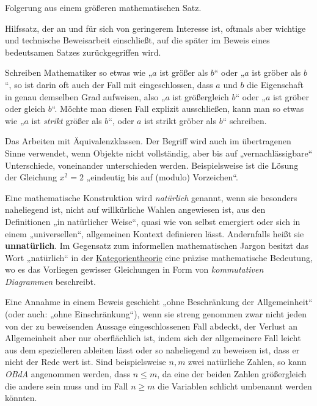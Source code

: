 \begin{description}[labelindent=0pt, leftmargin=0pt]
    \item[Korollar:] Folgerung aus einem größeren mathematischen Satz.

    \item[Lemma:] Hilfssatz, der an und für sich von geringerem Interesse ist, oftmals aber wichtige und technische Beweisarbeit einschließt, auf die später im Beweis eines bedeutsamen Satzes zurückgegriffen wird.

    \item[Mathematischer Komparativ:] Schreiben Mathematiker so etwas wie „$a$ ist größer als $b$“ oder „$a$ ist gröber als $b$“, so ist darin oft auch der Fall mit eingeschlossen, dass $a$ und $b$ die Eigenschaft in genau demselben Grad aufweisen, also „$a$ ist größergleich $b$“ oder „$a$ ist gröber oder gleich $b$“. Möchte man diesen Fall explizit ausschließen, kann man so etwas wie „$a$ ist \emph{strikt} größer als $b$“, oder $a$ ist strikt gröber als $b$“ schreiben.
    
    \item[Modulo:] Das Arbeiten mit Äquivalenzklassen. Der Begriff wird auch im übertragenen Sinne verwendet, wenn Objekte nicht vollständig, aber bis auf „vernachlässigbare“ Unterschiede, voneinander unterschieden werden. Beispielsweise ist die Lösung der Gleichung $x^2=2$ „eindeutig bis auf (\glq modulo\grq) Vorzeichen“.

    \item[Natürlich:] Eine mathematische Konstruktion wird \emph{natürlich} genannt, wenn sie besonders naheliegend ist, nicht auf willkürliche Wahlen angewiesen ist, aus den Definitionen „in natürlicher Weise“, quasi wie von selbst emergiert oder sich in einem „universellen“, allgemeinen Kontext definieren lässt. Andernfalls heißt sie \textbf{unnatürlich}. Im Gegensatz zum informellen mathematischen Jargon besitzt das Wort „natürlich“ in der \href{https://ncatlab.org/nlab/show/category+theory}{Kategorientheorie} eine präzise mathematische Bedeutung, wo es das Vorliegen gewisser Gleichungen in Form von \emph{kommutativen Diagrammen} beschreibt.

    \item[Ohne Beschränkung der Allgemeinheit (OBdA):] Eine Annahme in einem Beweis geschieht „ohne Beschränkung der Allgemeinheit“ (oder auch: „ohne Einschränkung“), wenn sie streng genommen zwar nicht jeden von der zu beweisenden Aussage eingeschlossenen Fall abdeckt, der Verlust an Allgemeinheit aber nur oberflächlich ist, indem sich der allgemeinere Fall leicht aus dem spezielleren ableiten lässt oder so naheliegend zu beweisen ist, dass er nicht der Rede wert ist. Sind beispielsweise $n,m$ zwei natürliche Zahlen, so kann \emph{OBdA} angenommen werden, dass $n\le m$, da eine der beiden Zahlen größergleich die andere sein muss und im Fall $n\ge m$ die Variablen schlicht umbenannt werden könnten.


\end{description}
